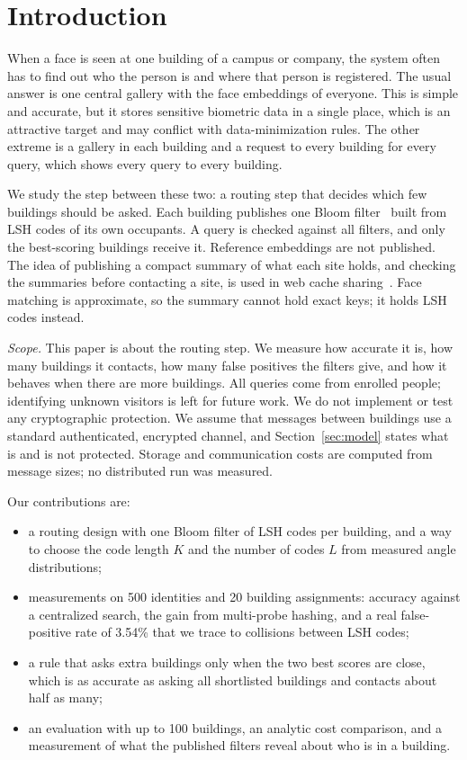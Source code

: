 \documentclass[runningheads]{llncs}
\begin{document}
\section{Introduction}
\label{sec:intro}

When a face is seen at one building of a campus or company, the system often has to find out who the person is and
where that person is registered. The usual answer is one central gallery with the face embeddings of everyone. This
is simple and accurate, but it stores sensitive biometric data in a single place, which is an attractive target and
may conflict with data-minimization rules. The other extreme is a gallery in each building and a request to every
building for every query, which shows every query to every building.

We study the step between these two: a routing step that decides which few buildings should be asked. Each
building publishes one Bloom filter~\cite{bloom1970} built from LSH codes of its own occupants. A query is checked
against all filters, and only the best-scoring buildings receive it. Reference embeddings are not published. The
idea of publishing a compact summary of what each site holds, and checking the summaries before contacting a site,
is used in web cache sharing~\cite{fan2000}. Face matching is approximate, so the summary cannot hold exact keys;
it holds LSH codes instead.

\emph{Scope.} This paper is about the routing step. We measure how accurate it is, how many buildings it contacts,
how many false positives the filters give, and how it behaves when there are more buildings. All queries come from
enrolled people; identifying unknown visitors is left for future work. We do not implement or test any
cryptographic protection. We assume that messages between buildings use a standard authenticated, encrypted
channel, and Section~\ref{sec:model} states what is and is not protected. Storage and communication costs are
computed from message sizes; no distributed run was measured.

Our contributions are:
\begin{itemize}
\item a routing design with one Bloom filter of LSH codes per building, and a way to choose the code length $K$ and
the number of codes $L$ from measured angle distributions;
\item measurements on 500 identities and 20 building assignments: accuracy against a centralized search, the gain
from multi-probe hashing, and a real false-positive rate of 3.54\% that we trace to collisions between LSH codes;
\item a rule that asks extra buildings only when the two best scores are close, which is as accurate as asking all
shortlisted buildings and contacts about half as many;
\item an evaluation with up to 100 buildings, an analytic cost comparison, and a measurement of what the published
filters reveal about who is in a building.
\end{itemize}
\end{document}
